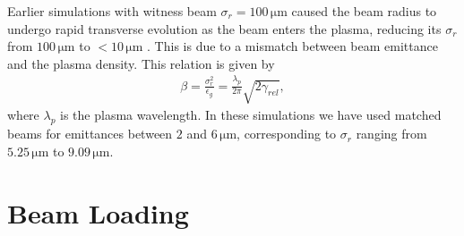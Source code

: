 \documentclass[aps,prstab,reprint,amsmath,amssymb,groupedaddress]{revtex4-1}
\newcommand{\unit}[1]{\,\mathrm{#1}}
\begin{document}
Earlier simulations with witness beam $\sigma_{r} = 100\unit{\mu m}$ caused the beam radius to undergo rapid transverse
evolution as the beam enters the plasma, reducing its $\sigma_{r}$ from $100\unit{\mu m}$ to $< 10\unit{\mu m}$
\cite{berglyd_olsen:2016}. This is due to a mismatch between beam emittance and the plasma density. This relation is
given by
\begin{align}
    \beta = \frac{\sigma_r^2}{\epsilon_g} = \frac{\lambda_p}{2\pi}\sqrt{2\gamma_{rel}}, \label{EQ:Matched}
\end{align}
where $\lambda_{p}$ is the plasma wavelength. In these simulations we have used matched beams for emittances between
$2$ and $6\unit{\mu m}$, corresponding to $\sigma_{r}$ ranging from $5.25\unit{\mu m}$ to $9.09\unit{\mu m}$.

\section[\label{S:BL}]{Beam Loading}
\end{document}
